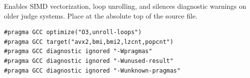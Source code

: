 
Enables SIMD vectorization, loop unrolling, and silences diagnostic warnings on older judge systems. Place at the absolute top of the source file.

\begin{lstlisting}
#pragma GCC optimize("O3,unroll-loops")
#pragma GCC target("avx2,bmi,bmi2,lzcnt,popcnt")
#pragma GCC diagnostic ignored "-Wpragmas"
#pragma GCC diagnostic ignored "-Wunused-result"
#pragma GCC diagnostic ignored "-Wunknown-pragmas"
\end{lstlisting}
